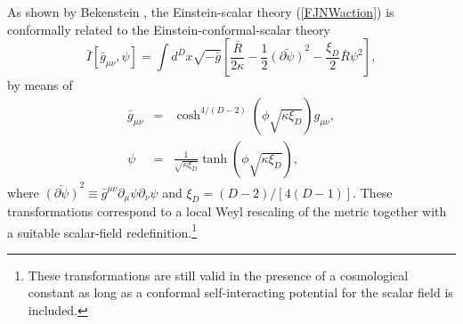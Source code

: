 \documentclass[aps,preprint,groupedaddress,nofootinbib,superscriptaddress,showkeys,showpacs,eqsecnum,amsmath,amssymb]{revtex4-1}
\begin{document}
As shown by Bekenstein \cite{Bekenstein:1974sf}, the Einstein-scalar theory (\ref{FJNWaction}) is conformally related to the Einstein-conformal-scalar theory
\begin{equation}
\bar{I}[\bar{g}_{\mu\nu},\psi]=\int d^Dx \sqrt{-\bar{g}}\left[\frac{\bar{R}}{2\kappa}-\frac{1}{2}\bar{(\partial \psi)}^2 -\frac{\xi_D}{2}\bar{R}\psi^2\right], \label{BBMBaction}
\end{equation}
by means of
\begin{subequations}
\begin{eqnarray}
\bar{g}_{\mu\nu}&=&\cosh^{4/(D-2)}\left(\phi\sqrt{\kappa \xi_D}\right)g_{\mu\nu}, \\
\psi&=&\frac{1}{\sqrt{\kappa\xi_D}}\tanh\left(\phi\sqrt{\kappa\xi_D}\right),
\end{eqnarray}
\label{bektrans}
\end{subequations} 
where $\bar{(\partial \psi)}^2 \equiv \bar{g}^{\mu\nu}\partial_\mu\psi \partial_\nu\psi$ and $\xi_D = ({D-2})/{[4(D-1)]}$. These transformations correspond to a local Weyl rescaling of the metric together with a suitable scalar-field redefinition.\footnote{These transformations are still valid in the presence of a cosmological constant as long as a conformal self-interacting potential for the scalar field is included.} 
\end{document}
